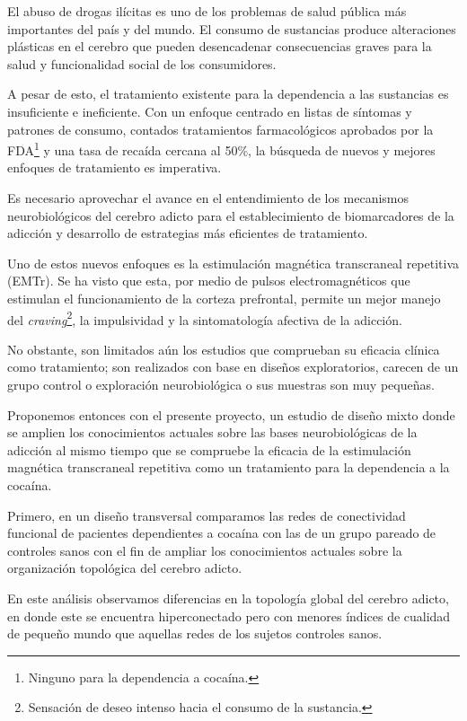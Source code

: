 El abuso de drogas ilícitas es uno de los problemas de salud pública más
importantes del país y del mundo.
El consumo de sustancias produce alteraciones plásticas en el
cerebro que pueden desencadenar consecuencias graves para la salud y funcionalidad
social de los consumidores. \par
A pesar de esto, el tratamiento existente para la dependencia a las sustancias es insuficiente e ineficiente.
Con un enfoque centrado en listas de síntomas y patrones de consumo, contados tratamientos farmacológicos aprobados por la FDA\footnote{Ninguno para la dependencia a cocaína.}
y una tasa de recaída cercana al 50\%, la búsqueda de nuevos y mejores enfoques de tratamiento es imperativa.\par
Es necesario aprovechar el avance en el entendimiento de los mecanismos neurobiológicos del cerebro adicto para el establecimiento de biomarcadores de la adicción y desarrollo de estrategias más eficientes de tratamiento.\par
Uno de estos nuevos enfoques es la estimulación magnética transcraneal repetitiva (EMTr). Se ha visto que esta, por medio de pulsos electromagnéticos que estimulan el funcionamiento de la corteza prefrontal, permite un mejor manejo del \textit{craving}\footnote{Sensación de deseo intenso hacia el consumo de la sustancia.}, la impulsividad y la sintomatología afectiva de la adicción. \par
No obstante, son limitados aún los estudios que comprueban su eficacia clínica como tratamiento; son realizados con base en diseños exploratorios, carecen de un grupo control o exploración neurobiológica o sus muestras son muy pequeñas.\par
Proponemos entonces con el presente proyecto, un estudio de diseño mixto donde se amplien los conocimientos actuales sobre las bases neurobiológicas de la adicción al mismo tiempo que se compruebe la eficacia de la estimulación magnética transcraneal repetitiva como un tratamiento para la dependencia a la cocaína.\par
Primero, en un diseño transversal comparamos las redes de conectividad funcional de pacientes dependientes a cocaína con las de un grupo pareado de controles sanos con el fin de ampliar los conocimientos actuales sobre la organización topológica del cerebro adicto.\par
En este análisis observamos diferencias en la topología global del cerebro adicto, en donde este se encuentra hiperconectado pero con menores índices de cualidad de pequeño mundo que aquellas redes de los sujetos controles sanos.\par

